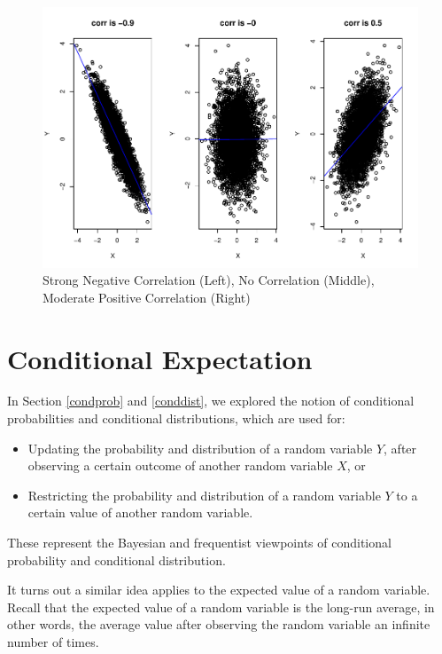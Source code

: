 \documentclass[
]{book}
\providecommand{\tightlist}{%
  \setlength{\itemsep}{0pt}\setlength{\parskip}{0pt}}
\begin{document}
\begin{figure}
\centering
\includegraphics{bookdown-demo_files/figure-latex/5-corrs-1.pdf}
\caption{\label{fig:5-corrs}Strong Negative Correlation (Left), No Correlation (Middle), Moderate Positive Correlation (Right)}
\end{figure}

\hypertarget{condexp}{%
\section{Conditional Expectation}\label{condexp}}

In Section \ref{condprob} and \ref{conddist}, we explored the notion of conditional probabilities and conditional distributions, which are used for:

\begin{itemize}
\tightlist
\item
  Updating the probability and distribution of a random variable \(Y\), after observing a certain outcome of another random variable \(X\), or
\item
  Restricting the probability and distribution of a random variable \(Y\) to a certain value of another random variable.
\end{itemize}

These represent the Bayesian and frequentist viewpoints of conditional probability and conditional distribution.

It turns out a similar idea applies to the expected value of a random variable. Recall that the expected value of a random variable is the long-run average, in other words, the average value after observing the random variable an infinite number of times.
\end{document}
